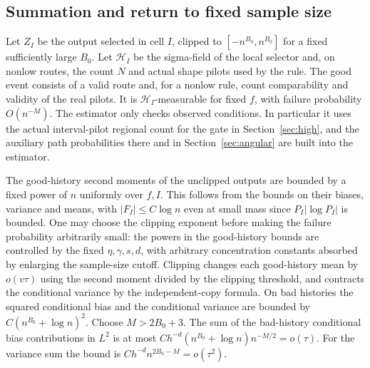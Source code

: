\subsection{Summation and return to fixed sample size}

Let \(Z_I\) be the output selected in cell \(I\), clipped
to \([-n^{B_0},n^{B_0}]\) for a fixed sufficiently large
\(B_0\). Let \(\mathcal H_I\) be the sigma-field of the
local selector and, on nonlow routes, the count \(N\) and
actual shape pilots used by the rule. The good event consists
of a valid route and, for a nonlow rule, count comparability
and validity of the real pilots. It is \(\mathcal H_I\)-measurable
for fixed \(f\), with failure probability \(O(n^{-M})\).
The estimator only checks observed conditions. In particular
it uses the actual interval-pilot regional count for the
gate in Section~\ref{sec:high}, and the auxiliary path
probabilities there and in Section~\ref{sec:angular} are
built into the estimator.

The good-history second moments of the unclipped outputs
are bounded by a fixed power of \(n\) uniformly over \(f,I\).
This follows from the bounds on their biases, variance and
means, with \(|F_I|\le C\log n\) even at small mass since
\(P_I|\log P_I|\) is bounded. One may choose the clipping
exponent before making the failure probability arbitrarily
small: the powers in the good-history bounds are controlled
by the fixed \(\eta,\gamma,s,d\), with arbitrary concentration
constants absorbed by enlarging the sample-size cutoff.
Clipping changes each good-history mean by \(o(v\tau)\)
using the second moment divided by the clipping threshold,
and contracts the conditional variance by the independent-copy
formula. On bad histories the squared conditional bias and
the conditional variance are bounded by
\(C(n^{B_0}+\log n)^2\). Choose \(M>2B_0+3\).
The sum of the bad-history conditional bias contributions
in \(L^2\) is at most
\(C h^{-d}(n^{B_0}+\log n)n^{-M/2}=o(\tau)\).
For the variance sum the bound is
\(C h^{-d}n^{2B_0-M}=o(\tau^2)\).

